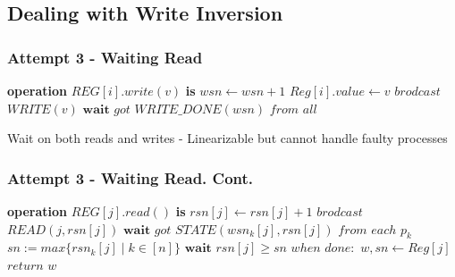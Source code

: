 \subsection{Dealing with Write Inversion}
\begin{frame}[fragile]
    \frametitle{Attempt 3 - Waiting Read}
    \begin{algorithm}[H]
        \begin{algorithmic}[0]
            \STATE \textbf{operation} $REG[i].write(v)$ \textbf{is}
            \bindent
                \STATE $wsn\leftarrow wsn+1$
                \STATE $Reg[i].value \leftarrow v$
                \STATE $brodcast$ $WRITE(v)$
                \STATE $\textbf{wait}$ $got$ $WRITE\_DONE(wsn)$ $from$ $all$
            \eindent
        \end{algorithmic}
        \caption{Wait on both reads and writes -
            Linearizable but cannot handle faulty processes}
    \end{algorithm}
\end{frame}

\begin{frame}[fragile]
    \frametitle{Attempt 3 - Waiting Read. Cont.}
    \begin{algorithm}[H]
        \begin{algorithmic}[0]
            \STATE \textbf{operation} $REG[j].read()$ \textbf{is}
            \bindent
                \STATE $rsn[j]\leftarrow rsn[j]+1$
                \STATE $brodcast$ $READ(j, rsn[j])$
                \STATE $\textbf{wait}$ $got$ $STATE(wsn_k[j], rsn[j])$ $from$ $each$ $p_k$
                \STATE $sn := max\{rsn_k[j]\mid k\in[n]\}$
                \STATE $\textbf{wait}$ $rsn[j] \geq sn$
                \STATE $when$ $done:$ $w, sn \leftarrow Reg[j]$
                \STATE $return$ $w$
            \eindent
        \end{algorithmic}
        \caption*{}
    \end{algorithm}
\end{frame}

